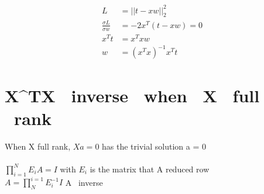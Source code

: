 \documentclass[12pt,letterpaper]{article}
\begin{document}
    \begin{align*}
        L &= ||t - xw||_2^2\\
        \frac{\sigma L}{\sigma w} &= -2x^T(t-xw) = 0\\
        x^Tt &= x^Txw\\
        w &= (x^Tx)^{-1}x^Tt
    \end{align*}
    
    \newpage
    \section{X^TX \ inverse \ when \ X \ full \ rank}
    When X full rank, \(Xa = 0\) has the trivial solution a = 0\\
    \rightarrow {}\\
    \rightarrow \(\prod_{i=1}^{N}E_i A = I\) \text with $E_i$ is the matrix that A reduced row\\
    \rightarrow $A = \prod_{N}^{i=1}E_i^{-1}I$ \rightarrow A \ inverse
\end{document}
